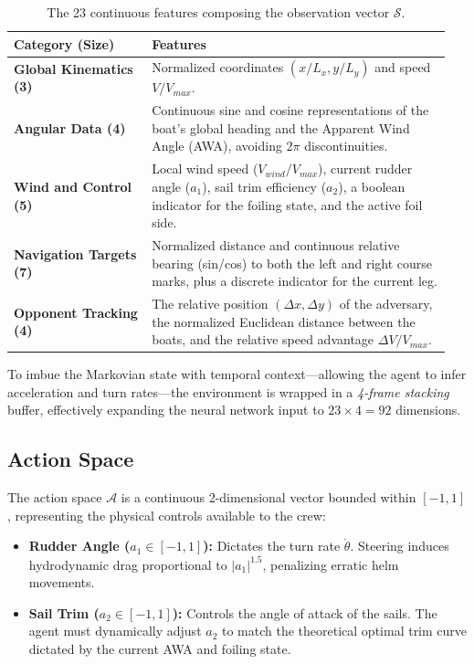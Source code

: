 \documentclass{article}
\begin{document}
\begin{table}[htpb]
    \centering
    \renewcommand{\arraystretch}{1.2}
    \begin{tabular}{|p{0.3\linewidth}|p{0.65\linewidth}|}
        \hline
        \textbf{Category (Size)} & \textbf{Features} \\
        \hline
        \textbf{Global Kinematics (3)} & Normalized coordinates $(x/L_x, y/L_y)$ and speed $V/V_{max}$. \\
        \hline
        \textbf{Angular Data (4)} & Continuous sine and cosine representations of the boat's global heading and the Apparent Wind Angle (AWA), avoiding $2\pi$ discontinuities. \\
        \hline
        \textbf{Wind and Control (5)} & Local wind speed ($V_{wind}/V_{max}$), current rudder angle ($a_1$), sail trim efficiency ($a_2$), a boolean indicator for the foiling state, and the active foil side. \\
        \hline
        \textbf{Navigation Targets (7)} & Normalized distance and continuous relative bearing (sin/cos) to both the left and right course marks, plus a discrete indicator for the current leg. \\
        \hline
        \textbf{Opponent Tracking (4)} & The relative position $(\Delta x, \Delta y)$ of the adversary, the normalized Euclidean distance between the boats, and the relative speed advantage $\Delta V / V_{max}$. \\
        \hline
    \end{tabular}
    \caption{The 23 continuous features composing the observation vector $\mathcal{S}$.}
    \label{tab:observation_space}
\end{table}
To imbue the Markovian state with temporal context---allowing the agent to infer acceleration and turn rates---the environment is wrapped in a \textit{4-frame stacking} buffer, effectively expanding the neural network input to $23 \times 4 = 92$ dimensions.

\subsection{Action Space}
The action space $\mathcal{A}$ is a continuous 2-dimensional vector bounded within $[-1, 1]$, representing the physical controls available to the crew:
\begin{itemize}
    \item \textbf{Rudder Angle ($a_1 \in [-1, 1]$):} Dictates the turn rate $\dot{\theta}$. Steering induces hydrodynamic drag proportional to $|a_1|^{1.5}$, penalizing erratic helm movements.
    \item \textbf{Sail Trim ($a_2 \in [-1, 1]$):} Controls the angle of attack of the sails. The agent must dynamically adjust $a_2$ to match the theoretical optimal trim curve dictated by the current AWA and foiling state.
\end{itemize}
\end{document}
